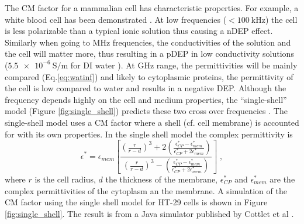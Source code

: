 \documentclass[final]{jyflluk}
\begin{document}
The CM factor for a mammalian cell has characteristic properties. For example, a white blood cell has been demonstrated \cite{voldman_electrical_2006}. At low frequencies ($<\SI{100}{\kilo \Hz}$) the cell is less polarizable than a typical ionic solution thus causing a nDEP effect. Similarly when going to MHz frequencies, the conductivities of the solution and the cell will matter more, thus resulting in a pDEP in low conductivity solutions ($\SI{5.5e-6}{ \siemens \per \metre}$ for DI water \cite{pashley2005gassed}). At GHz range, the permittivities will be mainly compared (Eq.\ref{eq:watinf}) and likely to cytoplasmic proteins, the permittivity of the cell is low compared to water and results in a negative DEP.  Although the frequency depends highly on the cell and medium properties, the “single-shell” model (Figure \ref{fig:single_shell}) predicts these two cross over frequencies \cite{cetin_dielectrophoresis_2011,pethig_review_2010, voldman_electrical_2006, cottet_mydep_2019}. The single-shell model uses a CM factor where a shell (cf. cell membrane) is accounted for with its own properties. In the single shell model the complex permittivity is
%
\begin{equation}
   \label{eq:shellmodel}
   \epsilon^*=\epsilon_{mem} \left[ \frac{\left( \frac{r}{r-d}\right)^3 + 2\left(\frac{\epsilon_{CP}^* - \epsilon_{mem}^*}{\epsilon_{CP}^* + 2\epsilon_{mem}^*} \right)}{\left( \frac{r}{r-d}\right)^3 -\left(\frac{\epsilon_{CP}^* - \epsilon_{mem}^*}{\epsilon_{CP}^* + 2\epsilon_{mem}^*} \right)}        \right] \;,
\end{equation}
%
where $r$ is the cell radius, $d$ the thickness of the membrane, $\epsilon_{CP}^*$ and  $\epsilon_{mem}^*$ are the complex permittivities of the cytoplasm an the membrane. A simulation of the CM factor using the single shell model for HT-29 cells is shown in Figure \ref{fig:single_shell}. The result is from a Java  simulator published by Cottlet et al \cite{cottet_mydep_2019}.
\end{document}
